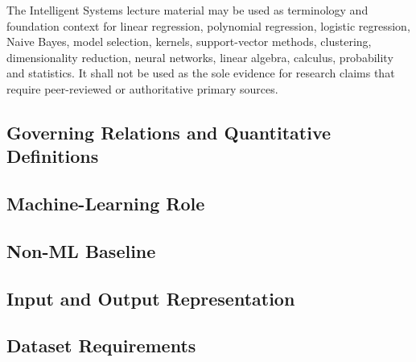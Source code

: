 The Intelligent Systems lecture material may be used as terminology and
foundation context for linear regression, polynomial regression, logistic
regression, Naive Bayes, model selection, kernels, support-vector methods,
clustering, dimensionality reduction, neural networks, linear algebra, calculus,
probability and statistics. It shall not be used as the sole evidence for
research claims that require peer-reviewed or authoritative primary sources.

\subsection{Governing Relations and Quantitative Definitions}
\label{sec:res-ml-alg-governing-relations}

%

\subsection{Machine-Learning Role}
\label{sec:res-ml-alg-machine-learning-role}


\subsection{Non-ML Baseline}
\label{sec:res-ml-alg-non-ml-baseline}


\subsection{Input and Output Representation}
\label{sec:res-ml-alg-input-output-representation}


\subsection{Dataset Requirements}
\label{sec:res-ml-alg-dataset-requirements}


